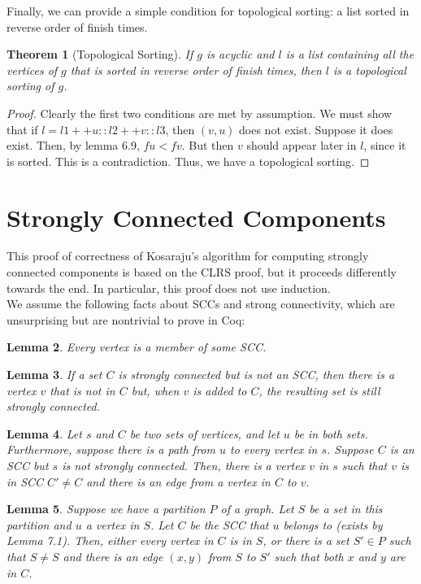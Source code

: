 \documentclass{article}
\newtheorem{theorem}{Theorem}[section]
\newtheorem{lemma}[theorem]{Lemma}
\begin{document}
Finally, we can provide a simple condition for topological sorting: a list sorted in reverse order of finish times.
\begin{theorem}[Topological Sorting]
If $g$ is acyclic and $l$ is a list containing all the vertices of $g$ that is sorted in reverse order of finish times, then $l$ is a topological sorting of $g$.
\end{theorem}
\begin{proof}
Clearly the first two conditions are met by assumption. We must show that if $l = l1 ++ u :: l2 ++ v :: l3$, then $(v,u)$ does not exist. Suppose it does exist. Then, by lemma 6.9, $fu < fv$. But then $v$ should appear later in $l$, since it is sorted. This is a contradiction. Thus, we have a topological sorting.
\end{proof}
\section{Strongly Connected Components}
This proof of correctness of Kosaraju's algorithm for computing strongly connected components is based on the CLRS proof, but it proceeds differently towards the end. In particular, this proof does not use induction.
\\We assume the following facts about SCCs and strong connectivity, which are unsurprising but are nontrivial to prove in Coq:
\begin{lemma}
Every vertex is a member of some SCC.
\end{lemma}
\begin{lemma}
If a set $C$ is strongly connected but is not an SCC, then there is a vertex $v$ that is not in $C$ but, when $v$ is added to $C$, the resulting set is still strongly connected.
\end{lemma}
\begin{lemma}
Let $s$ and $C$ be two sets of vertices, and let $u$ be in both sets. Furthermore, suppose there is a path from $u$ to every vertex in $s$. Suppose $C$ is an SCC but $s$ is not strongly connected. Then, there is a vertex $v$ in $s$ such that $v$ is in SCC $C'\neq C$ and there is an edge from a vertex in $C$ to $v$. 
\end{lemma}
\begin{lemma}
Suppose we have a partition $P$ of a graph. Let $S$ be a set in this partition and $u$ a vertex in $S$. Let $C$ be the SCC that $u$ belongs to (exists by Lemma 7.1). Then, either every vertex in $C$ is in $S$, or there is a set $S' \in P$ such that $S\neq S$ and there is an edge $(x,y)$ from $S$ to $S'$ such that both $x$ and $y$ are in $C$.
\end{lemma}
\end{document}
